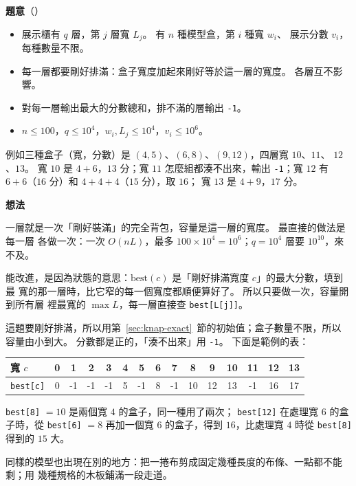 \textbf{題意}（）

\begin{itemize}
\item 展示櫃有 $q$ 層，第 $j$ 層寬 $L_j$。 有 $n$ 種模型盒，第 $i$ 種寬 $w_i$、
展示分數 $v_i$，每種數量不限。
\item 每一層都要剛好排滿：盒子寬度加起來剛好等於這一層的寬度。 各層互不影響。
\item 對每一層輸出最大的分數總和，排不滿的層輸出 \texttt{-1}。
\item $n \le 100$，$q \le 10^4$，$w_i, L_j \le 10^4$，$v_i \le 10^6$。
\end{itemize}

例如三種盒子（寬，分數）是 $(4, 5)$、$(6, 8)$、$(9, 12)$，四層寬 $10$、$11$、
$12$、$13$。 寬 $10$ 是 $4 + 6$，$13$ 分；寬 $11$ 怎麼組都湊不出來，輸出
\texttt{-1}；寬 $12$ 有 $6 + 6$（$16$ 分）和 $4 + 4 + 4$（$15$ 分），取 $16$；
寬 $13$ 是 $4 + 9$，$17$ 分。

\textbf{想法}

一層就是一次「剛好裝滿」的完全背包，容量是這一層的寬度。 最直接的做法是每一層
各做一次：一次 $O(nL)$，最多 $100 \times 10^4 = 10^6$；$q = 10^4$ 層要
$10^{10}$，來不及。

能改進，是因為狀態的意思：$\mathrm{best}(c)$ 是「剛好排滿寬度 $c$」的最大分數，填到最
寬的那一層時，比它窄的每一個寬度都順便算好了。 所以只要做一次，容量開到所有層
裡最寬的 $\max L$，每一層直接查 \texttt{best[L[j]]}。

這題要剛好排滿，所以用第~\ref{sec:knap-exact}~節的初始值；盒子數量不限，所以
容量由小到大。 分數都是正的，「湊不出來」用 \texttt{-1}。 下面是範例的表：

\begin{center}
\begin{tabular}{l|cccccccccccccc}
\toprule
寬 $c$ & 0 & 1 & 2 & 3 & 4 & 5 & 6 & 7 & 8 & 9 & 10 & 11 & 12 & 13 \\
\midrule
\texttt{best[c]} & 0 & -1 & -1 & -1 & 5 & -1 & 8 & -1 & 10 & 12 & 13 & -1 & 16 & 17 \\
\bottomrule
\end{tabular}
\end{center}

\texttt{best[8]} $= 10$ 是兩個寬 $4$ 的盒子，同一種用了兩次；
\texttt{best[12]} 在處理寬 $6$ 的盒子時，從 \texttt{best[6]} $= 8$ 再加一個寬
$6$ 的盒子，得到 $16$，比處理寬 $4$ 時從 \texttt{best[8]} 得到的 $15$ 大。

同樣的模型也出現在別的地方：把一捲布剪成固定幾種長度的布條、一點都不能剩；用
幾種規格的木板鋪滿一段走道。


